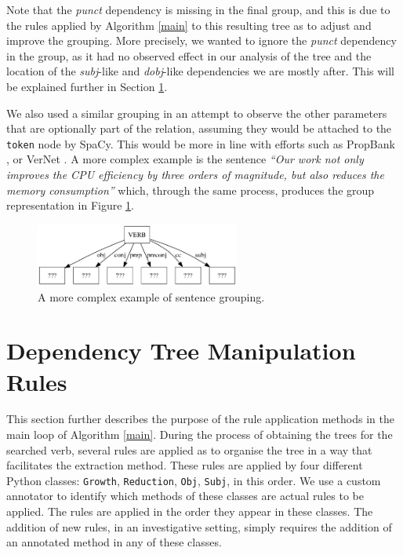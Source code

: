 \documentclass[11pt,a4paper,openright]{memoir}
\begin{document}
Note that the \emph{punct} dependency is missing in the final group, and this is due to the rules applied by Algorithm \ref{main} to this resulting tree as to adjust and improve the grouping. More precisely, we wanted to ignore the \emph{punct} dependency in the group, as it had no observed effect in our analysis of the tree and the location of the \emph{subj}-like and \emph{dobj}-like dependencies we are mostly after. This will be explained further in Section \ref{section:rules}. 

We also used a similar grouping in an attempt to observe the other parameters that are optionally part of the relation, assuming they would be attached to the \texttt{token} node by SpaCy. This would be more in line with efforts such as PropBank \cite{Palmer:2005:PBA:1122624.1122628}, or VerNet \cite{Schuler:2005:VBC:1104493}. A more complex example is the sentence \emph{\enquote{Our work not only improves the CPU efficiency by three orders of magnitude, but also reduces the memory consumption}} which, through the same process, produces the group representation in Figure \ref{fig:group_output_3}.

\begin{figure}[!htbp]
  \centering
    \includegraphics[width=0.6\textwidth]{./images/command-simplified-group-improves-29}
  \caption[A more complex example of sentence grouping.]{A more complex example of sentence grouping.}
  \label{fig:group_output_3}
\end{figure}



%
%
%
%

\section{Dependency Tree Manipulation Rules}
\label{section:rules}

This section further describes the purpose of the rule application methods in the main loop of Algorithm \ref{main}. During the process of obtaining the trees for the searched verb, several rules are applied as to organise the tree in a way that facilitates the extraction method. These rules are applied by four different Python classes: \texttt{Growth}, \texttt{Reduction}, \texttt{Obj}, \texttt{Subj}, in this order. We use a custom annotator to identify which methods of these classes are actual rules to be applied. The rules are applied in the order they appear in these classes. The addition of new rules, in an investigative setting, simply requires the addition of an annotated method in any of these classes.
\end{document}
